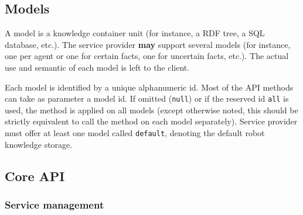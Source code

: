 
\subsection{Models}
\label{sect|kbapi-models}

A model is a knowledge container unit (for instance, a RDF tree, a SQL
database, etc.). The service provider \textbf{may} support several models
(for instance, one per agent or one for certain facts, one for uncertain facts,
etc.). The actual use and semantic of each model is left to the client.

Each model is identified by a unique alphanumeric id. Most of
the API methods can take as parameter a model id. If omitted ({\tt null}) or
if the reserved id {\tt all} is used, the method is applied on all models
(except otherwise noted, this should be strictly equivalent to call the method
on each model separately). Service provider must offer at least one model
called {\tt default}, denoting the default robot knowledge storage.


\subsection{Core API}

\subsubsection{Service management}

